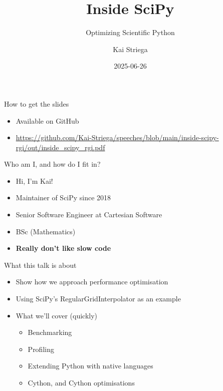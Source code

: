 \documentclass[12pt,xcolor=dvipsnames]{beamer}
\title{Inside SciPy}
\subtitle{Optimizing Scientific Python}
\date{2025-06-26}
\author{Kai Striega}
\institute{Cartesian Software \& SciPy}
\begin{document}
    \maketitle

    \begin{frame}{How to get the slides}
        \begin{itemize}
            \item Available on GitHub
            \item \url{https://github.com/Kai-Striega/speeches/blob/main/inside-scipy-rgi/out/inside_scipy_rgi.pdf}
        \end{itemize}
    \end{frame}

    \begin{frame}{Who am I, and how do I fit in?}
        \begin{itemize}
            \item Hi, I'm Kai!
            \item Maintainer of SciPy since 2018
            \item Senior Software Engineer at Cartesian Software
            \item BSc (Mathematics)
            \item \textbf{Really don't like slow code}
        \end{itemize}
    \end{frame}

    \begin{frame}{What this talk is about}
        \begin{itemize}
            \item Show how we approach performance optimisation
            \item Using SciPy’s RegularGridInterpolator as an example
            \item What we'll cover (quickly)
            \begin{itemize}
                \item Benchmarking
                \item Profiling
                \item Extending Python with native languages
                \item Cython, and Cython optimisations
            \end{itemize}
        \end{itemize}
    \end{frame}
\end{document}
